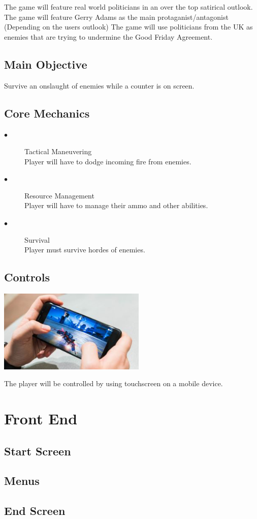 \documentclass[a4paper]{scrreprt}
\begin{document}
    The game will feature real world politicians in an over the top satirical outlook.
    The game will feature Gerry Adams as the main protaganist/antagonist (Depending on the users outlook)
    The game will use politicians from the UK as enemies that are trying to undermine the Good Friday Agreement.

    \section{Main Objective}

    Survive an onslaught of enemies while a counter is on screen.

    \section{Core Mechanics}

    \begin{description}
        \item[$\bullet$] Tactical Maneuvering \\
        Player will have to dodge incoming fire from enemies.
        \item[$\bullet$] Resource Management \\
        Player will have to manage their ammo and other abilities.
        \item[$\bullet$] Survival \\
        Player must survive hordes of enemies.
    \end{description}

    \section{Controls}

    \begin{center}
        \includegraphics[width=7cm]{mobile}
    \end{center}

    The player will be controlled by using touchscreen on a mobile device.

    \chapter{Front End}
    
    \section{Start Screen}
    
    \section{Menus}
    
    \section{End Screen}
\end{document}
